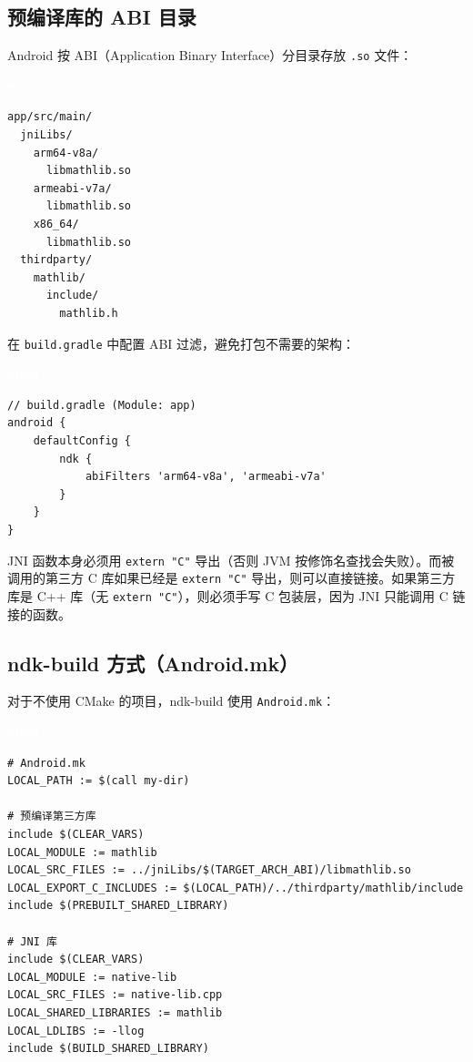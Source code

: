\documentclass[12pt,a4paper,fontset=fandol]{ctexbook}
\newcommand{\bashlabel}{%
  \begin{tcolorbox}[enhanced,colback=black!80,colframe=black!80,
    arc=1mm,boxrule=0mm,left=6pt,right=6pt,top=2pt,bottom=2pt,
    halign=left,oversize]
    \textcolor{white}{\small\bfseries Shell}
  \end{tcolorbox}\vspace{-4pt}}
\newcommand{\cpp}[1]{C++#1}
\begin{document}
\subsection{预编译库的 ABI 目录}

Android 按 ABI（Application Binary Interface）分目录存放 \texttt{.so} 文件：

\bashlabel
\begin{lstlisting}[style=bashstyle]
app/src/main/
  jniLibs/
    arm64-v8a/
      libmathlib.so
    armeabi-v7a/
      libmathlib.so
    x86_64/
      libmathlib.so
  thirdparty/
    mathlib/
      include/
        mathlib.h
\end{lstlisting}

在 \texttt{build.gradle} 中配置 ABI 过滤，避免打包不需要的架构：

\bashlabel
\begin{lstlisting}[style=bashstyle]
// build.gradle (Module: app)
android {
    defaultConfig {
        ndk {
            abiFilters 'arm64-v8a', 'armeabi-v7a'
        }
    }
}
\end{lstlisting}

\begin{tcolorbox}[warning={Android 的 extern "C" 要求}]
JNI 函数本身必须用 \texttt{extern "C"} 导出（否则 JVM 按修饰名查找会失败）。而被调用的第三方 C 库如果已经是 \texttt{extern "C"} 导出，则可以直接链接。如果第三方库是 \cpp{} 库（无 \texttt{extern "C"}），则必须手写 C 包装层，因为 JNI 只能调用 C 链接的函数。
\end{tcolorbox}

\subsection{ndk-build 方式（Android.mk）}

对于不使用 CMake 的项目，ndk-build 使用 \texttt{Android.mk}：

\bashlabel
\begin{lstlisting}[style=bashstyle]
# Android.mk
LOCAL_PATH := $(call my-dir)

# 预编译第三方库
include $(CLEAR_VARS)
LOCAL_MODULE := mathlib
LOCAL_SRC_FILES := ../jniLibs/$(TARGET_ARCH_ABI)/libmathlib.so
LOCAL_EXPORT_C_INCLUDES := $(LOCAL_PATH)/../thirdparty/mathlib/include
include $(PREBUILT_SHARED_LIBRARY)

# JNI 库
include $(CLEAR_VARS)
LOCAL_MODULE := native-lib
LOCAL_SRC_FILES := native-lib.cpp
LOCAL_SHARED_LIBRARIES := mathlib
LOCAL_LDLIBS := -llog
include $(BUILD_SHARED_LIBRARY)
\end{lstlisting}
\end{document}
